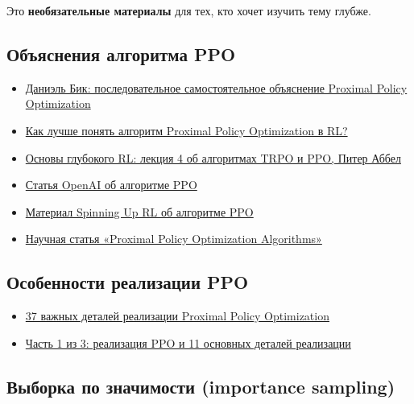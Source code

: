 \documentclass[11pt,a4paper]{article}
\begin{document}
Это \textbf{необязательные материалы} для тех, кто хочет изучить тему глубже.

\subsection{Объяснения алгоритма PPO}\label{ppo-explained}

\begin{itemize}
\tightlist
\item
  \href{https://fse.studenttheses.ub.rug.nl/25709/1/mAI_2021_BickD.pdf}{Даниэль Бик: последовательное самостоятельное объяснение Proximal Policy Optimization}
\item
  \href{https://stackoverflow.com/questions/46422845/what-is-the-way-to-understand-proximal-policy-optimization-algorithm-in-rl}{Как лучше понять алгоритм Proximal Policy Optimization в RL?}
\item
  \href{https://youtu.be/KjWF8VIMGiY}{Основы глубокого RL: лекция 4 об алгоритмах TRPO и PPO, Питер Аббел}
\item
  \href{https://openai.com/blog/openai-baselines-ppo/}{Статья OpenAI об алгоритме PPO}
\item
  \href{https://spinningup.openai.com/en/latest/algorithms/ppo.html}{Материал Spinning Up RL об алгоритме PPO}
\item
  \href{https://arxiv.org/abs/1707.06347}{Научная статья «Proximal Policy Optimization Algorithms»}
\end{itemize}

\subsection{Особенности реализации PPO}\label{ppo-implementation-details}

\begin{itemize}
\tightlist
\item
  \href{https://iclr-blog-track.github.io/2022/03/25/ppo-implementation-details/}{37 важных деталей реализации Proximal Policy Optimization}
\item
  \href{https://www.youtube.com/watch?v=MEt6rrxH8W4}{Часть 1 из 3: реализация PPO и 11 основных деталей реализации}
\end{itemize}

\subsection{Выборка по значимости (importance sampling)}\label{importance-sampling}
\end{document}

